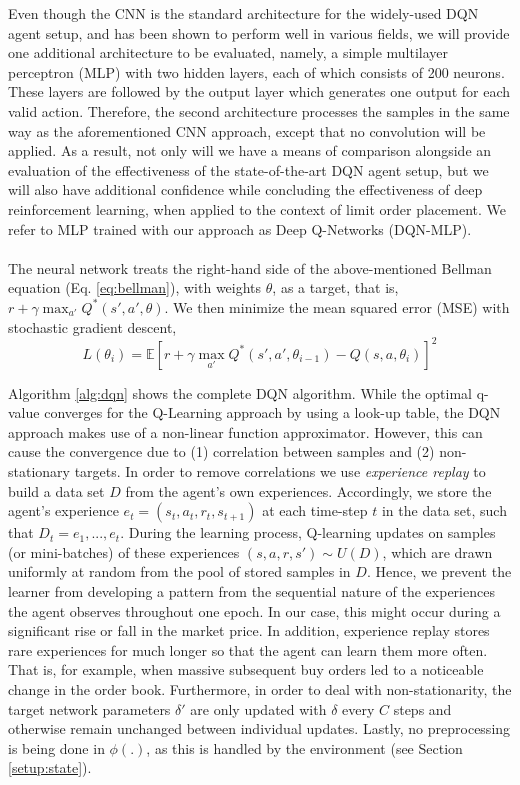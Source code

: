 Even though the CNN is the standard architecture for the widely-used DQN agent setup, and has been shown to perform well in various fields\cite{mnih2015human, mnih2013playing}, we will provide one additional architecture to be evaluated,
namely, a simple multilayer perceptron (MLP)\cite{haykin2009neural} with two hidden layers, each of which consists of 200 neurons. These layers are followed by the output layer which generates one output for each valid action.
Therefore, the second architecture processes the samples in the same way as the aforementioned CNN approach, except that no convolution will be applied.
As a result, not only will we have a means of comparison alongside an evaluation of the effectiveness of the state-of-the-art DQN agent setup, but we will also have additional confidence while concluding the effectiveness of deep reinforcement learning, when applied to the context of limit order placement. 
We refer to MLP trained with our approach as Deep Q-Networks (DQN-MLP).
\\
\\
The neural network treats the right-hand side of the above-mentioned Bellman equation (Eq. \ref{eq:bellman}), with weights $\theta$, as a target, that is, $r+\gamma \max_{a'} Q^*(s',a', \theta)$.
We then minimize the mean squared error (MSE) with stochastic gradient descent,
\begin{equation}\label{eq:dqn-mse}
    L(\theta_i)=\mathbb{E}[r+\gamma \max_{a'} Q^*(s',a', \theta_{i-1}) - Q(s,a,\theta_i)]^2
\end{equation}

Algorithm \ref{alg:dqn} shows the complete DQN algorithm.
While the optimal q-value converges for the Q-Learning approach by using a look-up table, the DQN approach makes use of a non-linear function approximator.
However, this can cause the convergence due to (1) correlation between samples and (2) non-stationary targets.
In order to remove correlations we use \textit{experience replay} to build a data set $D$ from the agent's own experiences.
Accordingly, we store the agent's experience $e_t=(s_t, a_t, r_t, s_{t+1})$ at each time-step $t$ in the data set, such that $D_t = {e_1, ..., e_t}$.
During the learning process, Q-learning updates on samples (or mini-batches) of these experiences $(s,a,r,s') \sim U(D)$, which are drawn uniformly at random from the pool of stored samples in $D$.
Hence, we prevent the learner from developing a pattern from the sequential nature of the experiences the agent observes throughout one epoch.
In our case, this might occur during a significant rise or fall in the market price.
In addition, experience replay stores rare experiences for much longer so that the agent can learn them more often.
That is, for example, when massive subsequent buy orders led to a noticeable change in the order book.
Furthermore, in order to deal with non-stationarity, the target network parameters $\delta'$ are only updated with $\delta$ every $C$ steps and otherwise remain unchanged between individual updates.
Lastly, no preprocessing is being done in $\phi(.)$, as this is handled by the environment (see Section \ref{setup:state}).

